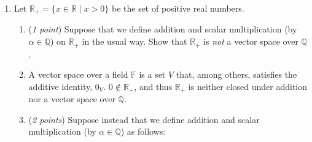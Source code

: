 \documentclass[11pt]{article}
\newcommand{\bbF}{\mathbb{F}}
\newcommand{\bbQ}{\mathbb{Q}}
\newcommand{\bbR}{\mathbb{R}}
\theoremstyle{definition}
\numberwithin{equation}{subsection}
\begin{document}
\begin{enumerate}
\begin{enumerate}
\item (\emph{2 points}) Construct a field with exactly $4$ elements. Hint: {\it it is enough to provide the addition and multiplication tables.}
\item[] A field $\bbF_4$ can be represented by the set \{$0,1,a,a+1$\} where $a+1=a^2$. Finite fields can only exist for sizes $p^n$ where $p$ is prime and $n\geq1$. Thus, the following tables represent an extension of $\bbF_2$ with each element writen as $x+y\alpha, xy\in \bbF_2$:
\[
\begin{array}{c|cccc}
+ & 0 & 1 & a & a+1 \\ \hline
0 & 0 & 1 & a & a+1 \\
1 & 1 & 0 & a+1 & a \\
a & a & a+1 & 0 & 1 \\
a+1 & a+1 & a & 1 & 0 \\
\end{array}
\]

\[
\begin{array}{c|cccc}
\times & 0 & 1 & a & a+1 \\ \hline
0 & 0 & 0 & 0 & 0 \\
1 & 0 & 1 & a & a+1 \\
a & 0 & a & a+1 & 1 \\
a+1 & 0 & a+1 & 1 & a \\
\end{array}
\]
\end{enumerate}

\item Let $\mathbb{R}_+=\{x\in\mathbb{R} \;|\; x>0\}$ be the set of positive real numbers. 
\begin{enumerate}

\item (\emph{1 point}) Suppose that we define addition and scalar multiplication (by $\alpha\in\mathbb{Q}$) on $\mathbb{R}_+$ in the usual way. Show that $\mathbb{R}_+$ is \emph{not} a vector space over $\mathbb{Q}$.
\item[] A vector space over a field $\bbF$ is a set $V$ that, among others, satisfies the additive identity, $0_V$. $0\notin \bbR_+$, and thus $\bbR_+$ is neither closed under addition nor a vector space over $\bbQ$.

\item (\emph{2 points}) Suppose instead that we define addition and scalar multiplication (by $\alpha\in\mathbb{Q}$) as follows:

\begin{itemize}


\end{itemize}
\end{enumerate}
\end{enumerate}
\end{document}

